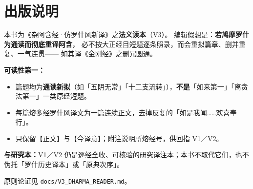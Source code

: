 
\chapter*{出版说明}

本书为《杂阿含经·仿罗什风新译》之\textbf{法义读本}（V3）。
编辑假想是：\textbf{若鸠摩罗什为通读而彻底重译阿含}，
必不按大正经目短题逐条照录，而会重拟篇章、删并重复、一气连贯——
如其译《金刚经》之删冗圆通。

\vspace{0.8em}
\noindent\textbf{可读性第一：}
\begin{itemize}
  \item 篇题均为\textbf{通读新拟}（如「五阴无常」「十二支流转」），\textbf{不是}「如来第一」「离贪法第一」一类原经短题。
  \item 每篇熔多经罗什风译文为一篇连续正文，去掉反复的「如是我闻……欢喜奉行」。
  \item 只保留【正文】与【今译意】；附注说明所熔经号，供回指 V1／V2。
\end{itemize}

\vspace{0.8em}
\noindent\textbf{与研究本：}V1／V2 仍是逐经全收、可核验的研究译注本；本书不取代它们，也不伪托「罗什历史译本」或「原典次序」。

\vspace{0.8em}
\noindent 原则论证见 \texttt{docs/V3\_DHARMA\_READER.md}。

\clearpage
